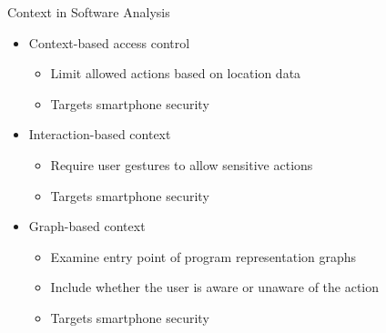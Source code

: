 \documentclass[handout,11pt]{beamer}
\begin{document}
	\begin{frame}{Context in Software Analysis}
		\begin{itemize}
			\item Context-based access control~\cite{%
					fernandezContextsContextbased2007,
					shebaroContextbasedAccess2015,
				}
				\begin{itemize}
					\item Limit allowed actions based on location data
					\item Targets smartphone security
				\end{itemize}
			\item Interaction-based context~\cite{shresthaTapwaverubLightweight2015}
				\begin{itemize}
					\item Require user gestures to allow sensitive actions
					\item Targets smartphone security
				\end{itemize}
			\item Graph-based context~\cite{narayananContextawareAdaptive2017}
				\begin{itemize}
					\item Examine entry point of program representation graphs
					\item Include whether the user is aware or unaware of the action
					\item Targets smartphone security
				\end{itemize}
		\end{itemize}
	\end{frame}
\end{document}
